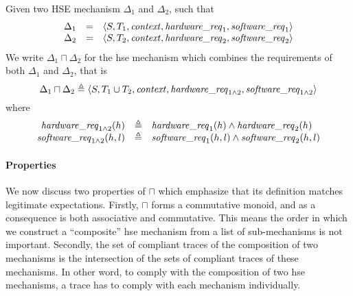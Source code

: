 \begin{definition}
  Given two HSE mechanism \( \Delta_1 \) and \( \Delta_2 \), such that
%
  \[
    \begin{array}{rcl}
      \Delta_1
      & =
      & \langle S, T_1, \mathit{context}, \mathit{hardware\_req}_1, \mathit{software\_req}_1
        \rangle \\
      \Delta_2
      & =
      & \langle S, T_2, \mathit{context}, \mathit{hardware\_req}_2, \mathit{software\_req}_2
        \rangle
    \end{array}
  \]
%
  We write $\Delta_1 \sqcap \Delta_2$ for the \ac{hse} mechanism which combines
  the requirements of both $\Delta_1$ and $\Delta_2$, that is
%
  \[
    \Delta_1 \sqcap \Delta_2 \triangleq \langle S, T_1 \cup T_2, \mathit{context},
    \mathit{hardware\_req}_{1\wedge2}, \mathit{software\_req}_{1\wedge2} \rangle
  \]
%
  where
  \[
    \begin{array}{rcl}
      \mathit{hardware\_req}_{1\wedge2}(h)
      & \triangleq
      & \mathit{hardware\_req}_1(h) \wedge \mathit{hardware\_req}_2(h) \\
      \mathit{software\_req}_{1\wedge2}(h,l)
      & \triangleq
      & \mathit{software\_req}_1(h,l) \wedge \mathit{software\_req}_2(h,l)
    \end{array}
  \]
\end{definition}

\paragraph{Properties}
%
We now discuss two properties of \( \sqcap \) which emphasize that its
definition matches legitimate expectations.
%
Firstly, \( \sqcap \) forms a commutative monoid, and as a consequence is both
associative and commutative.
%
This means the order in which we construct a ``composite'' \ac{hse} mechanism
from a list of sub-mechanisms is not important.
%
Secondly, the set of compliant traces of the composition of two mechanisms is
the intersection of the sets of compliant traces of these mechanisms.
%
In other word, to comply with the composition of two \ac{hse} mechanisms, a
trace has to comply with each mechanism individually.

